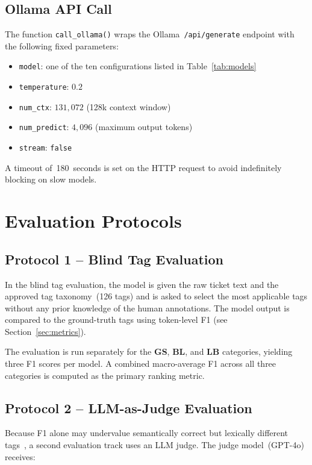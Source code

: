 \subsection{Ollama API Call}
%
The function \texttt{call\_ollama()} wraps the Ollama~\texttt{/api/generate}
endpoint with the following fixed parameters:

\begin{itemize}
    \item \texttt{model}: one of the ten configurations listed in
          Table~\ref{tab:models}
    \item \texttt{temperature}: $0.2$
    \item \texttt{num\_ctx}: $131{,}072$ (128k context window)
    \item \texttt{num\_predict}: $4{,}096$ (maximum output tokens)
    \item \texttt{stream}: \texttt{false}
\end{itemize}

A timeout of~180~seconds is set on the HTTP request to avoid indefinitely
blocking on slow models.

\section{Evaluation Protocols}
\label{sec:eval-protocols}
%
\subsection{Protocol 1 -- Blind Tag Evaluation}
\label{subsec:blind-eval}
%
In the blind tag evaluation, the model is given the raw ticket text and the
approved tag taxonomy~(126 tags) and is asked to select the most applicable
tags without any prior knowledge of the human annotations.  The model output
is compared to the ground-truth tags using token-level F1 (see
Section~\ref{sec:metrics}).

The evaluation is run separately for the \textbf{GS}, \textbf{BL}, and
\textbf{LB} categories, yielding three F1 scores per model.  A combined
macro-average F1 across all three categories is computed as the primary
ranking metric.

\subsection{Protocol 2 -- LLM-as-Judge Evaluation}
\label{subsec:judge-eval}
%
Because F1 alone may undervalue semantically correct but lexically different
tags~\cite{zheng2024judging}, a second evaluation track uses an LLM judge.
The judge model~(GPT-4o) receives:

